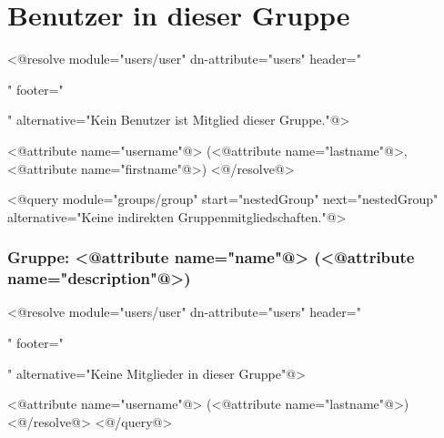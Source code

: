 \section*{Benutzer in dieser Gruppe}

<@resolve module="users/user" dn-attribute="users" header="\begin{itemize}" footer="\end{itemize}" alternative="Kein Benutzer ist Mitglied dieser Gruppe."@>
  \item <@attribute name="username"@> (<@attribute name="lastname"@>, <@attribute name="firstname"@>)
<@/resolve@>

<@query module="groups/group" start="nestedGroup" next="nestedGroup" alternative="Keine indirekten Gruppenmitgliedschaften."@>
  \subsubsection*{Gruppe: <@attribute name="name"@> (<@attribute name="description"@>)}
  <@resolve module="users/user" dn-attribute="users" header="\begin{itemize}" footer="\end{itemize}" alternative="Keine Mitglieder in dieser Gruppe"@>
    \item <@attribute name="username"@> (<@attribute name="lastname"@>)
  <@/resolve@>
<@/query@>

\newpage
